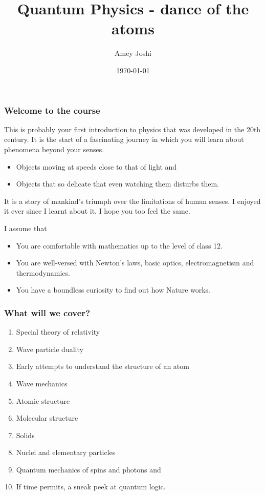 \documentclass{beamer}
\title{Quantum Physics - dance of the atoms}
\author{Amey Joshi}
\date{\today}
\begin{document}
\begin{frame}
\titlepage
\end{frame}

\begin{frame}
\frametitle{Welcome to the course}
This is probably your first introduction to physics that was developed in the
20th century. It is the start of a fascinating journey in which you will learn
about phenomena beyond your senses.
\begin{itemize}
\item Objects moving at speeds close to that of light and
\item Objects that so delicate that even watching them disturbs them.
\end{itemize}
It is a story of mankind's triumph over the limitations of human senses. I
enjoyed it ever since I learnt about it. I hope you too feel the same.

I assume that
\begin{itemize}
\item You are comfortable with mathematics up to the level of class 12.
\item You are well-versed with Newton's laws, basic optics, electromagnetism
and thermodynamics.
\item You have a boundless curiosity to find out how Nature works.
\end{itemize}
\end{frame}

\begin{frame}
\frametitle{What will we cover?}
\begin{enumerate}
\item Special theory of relativity
\item Wave particle duality
\item Early attempts to understand the structure of an atom
\item Wave mechanics
\item Atomic structure
\item Molecular structure
\item Solids
\item Nuclei and elementary particles
\item Quantum mechanics of spins and photons and
\item If time permits, a sneak peek at quantum logic.
\end{enumerate}
\end{frame}
\end{document}

